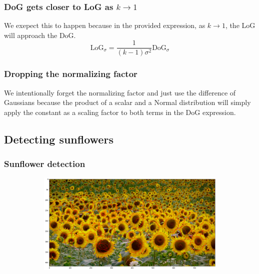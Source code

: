 \documentclass[12pt, oneside]{article}
\begin{document}
\subsubsection{DoG gets closer to LoG as $k \to 1$}
We exepect this to happen because in the provided expression, as $k \to 1$, the LoG will approach the DoG.
$$ \text{LoG}_\sigma = \frac{1}{(k - 1) \sigma^2}\text{DoG}_\sigma$$

\subsubsection{Dropping the normalizing factor}

We intentionally forget the normalizing factor and just use the difference of Gaussians because the product of a scalar and a Normal distribution will simply apply the constant as a scaling factor to both terms in the DoG expression.


\subsection{Detecting sunflowers}

\subsubsection{Sunflower detection}
\begin{figure}[H]
    \centering
    \begin{subfigure}[b]{1\textwidth}
        \centering
        \includegraphics[width=\textwidth]{imgs/q1.3_plot1.png}
    \end{subfigure}
    \caption{}
\end{figure}
\end{document}

